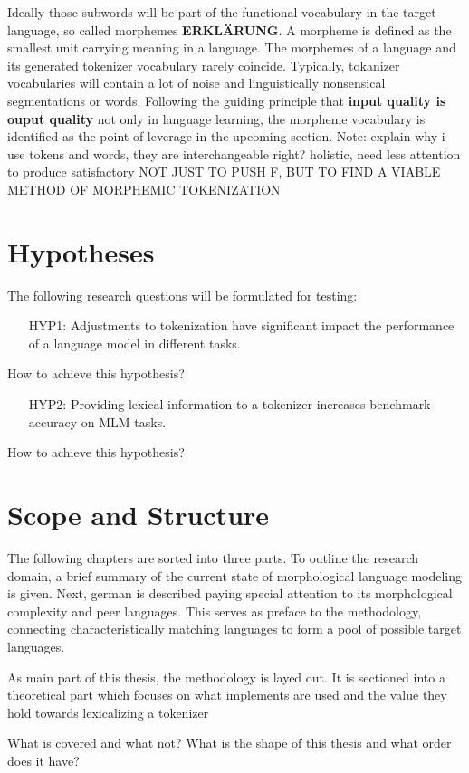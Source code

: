 Ideally those subwords will be part of the functional vocabulary in the target language, so called morphemes \textbf{ERKLÄRUNG}.
A morpheme is defined as the smallest unit carrying meaning in a language.
The morphemes of a language and its generated tokenizer vocabulary rarely coincide.
Typically, tokanizer vocabularies will contain a lot of noise and linguistically nonsensical segmentations or words.
Following the guiding principle that \textbf{input quality is ouput quality} not only in language learning, the morpheme vocabulary is identified as the point of leverage in the upcoming section.
Note: explain why i use tokens and words, they are interchangeable right?
holistic, need less attention to produce satisfactory
\uppercase{not just to push F, but to find a viable method of morphemic tokenization}


\section{Hypotheses}
\label{sec:hypothesis}

The following research questions will be formulated for testing:
\begin{framed}
    \begin{itemize}[itemindent=1em]
        \item[HYP1:] Adjustments to tokenization have significant impact the performance of a language model in different tasks.
    \end{itemize}
\end{framed}
How to achieve this hypothesis?
\begin{framed}
    \begin{itemize}[itemindent=1em]
        \item[HYP2:] Providing lexical information to a tokenizer increases benchmark accuracy on MLM tasks.
    \end{itemize}
\end{framed}
How to achieve this hypothesis?

\section{Scope and Structure}
\label{sec:scope-and-structure}

The following chapters are sorted into three parts.
To outline the research domain, a brief summary of the current state of morphological language modeling is given.
Next, german is described paying special attention to its morphological complexity and peer languages.
This serves as preface to the methodology, connecting characteristically matching languages to form a pool of possible  target languages.

As main part of this thesis, the methodology is layed out.
It is sectioned into a theoretical part which focuses on what implements are used and the value they hold towards lexicalizing a tokenizer

What is covered and what not?
What is the shape of this thesis and what order does it have?
